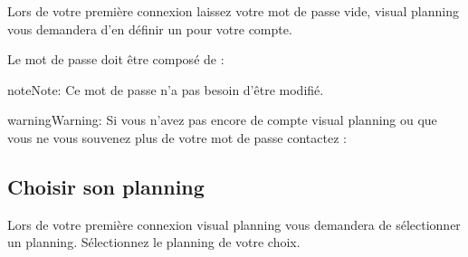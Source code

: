 \documentclass[letterpaper,10pt,english]{sphinxmanual}
\begin{document}
\begin{sphinxVerbatim}[commandchars=\\\{\}]
     
\end{sphinxVerbatim}

Lors de votre première connexion laissez votre mot de passe vide, visual planning vous demandera d’en définir un pour votre compte.

Le mot de passe doit être composé de :

\begin{sphinxVerbatim}[commandchars=\\\{\}]
  
  
    
\end{sphinxVerbatim}

\begin{sphinxadmonition}{note}{Note:}
Ce mot de passe n’a pas besoin d’être modifié.
\end{sphinxadmonition}

\begin{sphinxadmonition}{warning}{Warning:}
Si vous n’avez pas encore de compte visual planning ou que vous ne vous souvenez plus de votre mot de passe contactez : 
\end{sphinxadmonition}


\subsection{Choisir son planning}
\label{\detokenize{guide_visual_planning/guide_utilisation:choisir-son-planning}}
Lors de votre première connexion visual planning vous demandera de sélectionner un planning. Sélectionnez le planning de votre choix.
\end{document}
